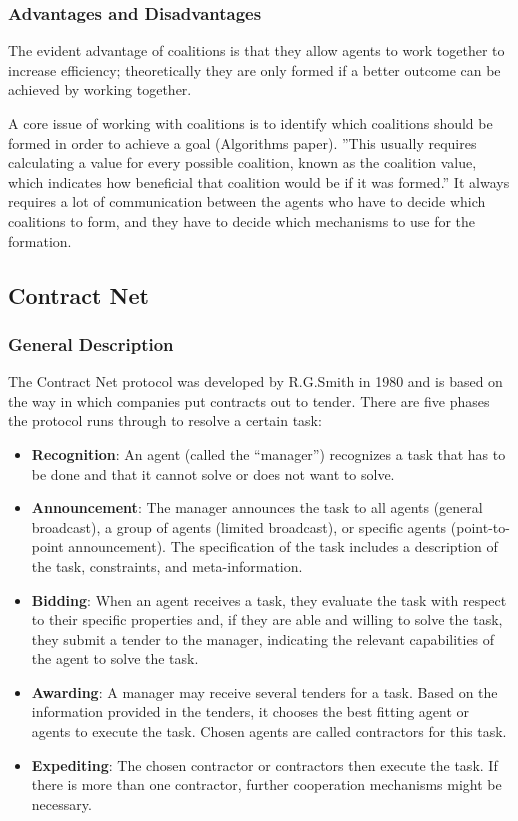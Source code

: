 \subsubsection{Advantages and Disadvantages}

The evident advantage of coalitions is that they allow agents to work together to increase efficiency; theoretically they are only formed if a better outcome can be achieved by working together. 

A core issue of working with coalitions is to identify which coalitions should be formed in order to achieve a goal (Algorithms paper). ''This usually requires calculating a value for every possible coalition, known as the coalition value, which indicates how beneficial that coalition would be if it was formed.'' It always requires a lot of communication between the agents who have to decide which coalitions to form, and they have to decide which mechanisms to use for the formation. 



\subsection{Contract Net}

\subsubsection{General Description}

The Contract Net protocol was developed by R.G.Smith in 1980 \cite{Smith:1980:CNP:1311969.1312903} and is based on the way in which companies put contracts out to tender. There are five phases the protocol runs through to resolve a certain task:

\begin{itemize}
	\item \textbf{Recognition}: An agent (called the ``manager'') recognizes a task that has to be done and that it cannot solve or does not want to solve.
	\item \textbf{Announcement}: The manager announces the task to all agents (general broadcast), a group of agents (limited broadcast), or specific agents (point-to-point announcement). The specification of the task includes a description of the task, constraints, and meta-information.
	\item \textbf{Bidding}: When an agent receives a task, they evaluate the task with respect to their specific properties and, if they are able and willing to solve the task, they submit a tender to the manager, indicating the relevant capabilities of the agent to solve the task.
	\item \textbf{Awarding}: A manager may receive several tenders for a task. Based on the information provided in the tenders, it chooses the best fitting agent or agents to execute the task. Chosen agents are called contractors for this task.
	\item \textbf{Expediting}: The chosen contractor or contractors then execute the task. If there is more than one contractor, further cooperation mechanisms might be necessary.
\end{itemize}

